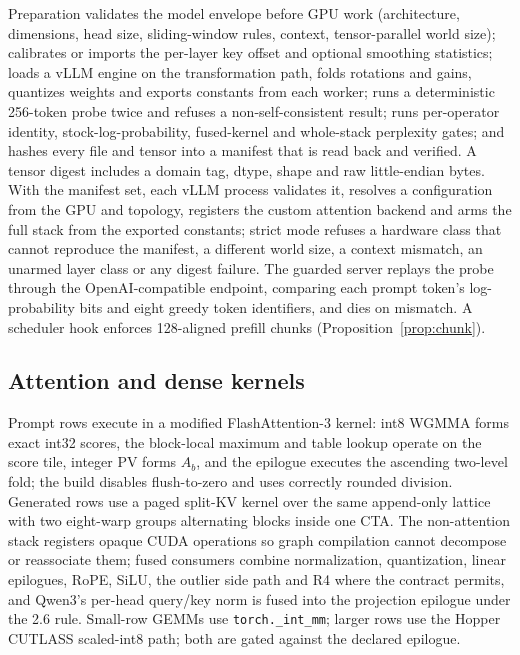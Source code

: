 \documentclass{article}
\begin{document}
Preparation validates the model envelope before GPU work (architecture, dimensions, head
size, sliding-window rules, context, tensor-parallel world size); calibrates or imports the
per-layer key offset and optional smoothing statistics; loads a vLLM engine on the
transformation path, folds rotations and gains, quantizes weights and exports constants from
each worker; runs a deterministic 256-token probe twice and refuses a non-self-consistent
result; runs per-operator identity, stock-log-probability, fused-kernel and whole-stack
perplexity gates; and hashes every file and tensor into a manifest that is read back and
verified.  A tensor digest includes a domain tag, dtype, shape and raw little-endian bytes.
With the manifest set, each vLLM process validates it, resolves a configuration from the GPU
and topology, registers the custom attention backend and arms the full stack from the
exported constants; strict mode refuses a hardware class that cannot reproduce the manifest,
a different world size, a context mismatch, an unarmed layer class or any digest failure.  The
guarded server replays the probe through the OpenAI-compatible endpoint, comparing each
prompt token's log-probability bits and eight greedy token identifiers, and dies on mismatch.
A scheduler hook enforces 128-aligned prefill chunks (Proposition~\ref{prop:chunk}).

\subsection{Attention and dense kernels}

Prompt rows execute in a modified FlashAttention-3 kernel: int8 WGMMA forms exact int32
scores, the block-local maximum and table lookup operate on the score tile, integer PV forms
$A_b$, and the epilogue executes the ascending two-level fold; the build disables
flush-to-zero and uses correctly rounded division.  Generated rows use a paged split-KV
kernel over the same append-only lattice with two eight-warp groups alternating blocks inside
one CTA.  The non-attention stack registers opaque CUDA operations so graph compilation
cannot decompose or reassociate them; fused consumers combine normalization, quantization,
linear epilogues, RoPE, SiLU, the outlier side path and R4 where the contract permits, and
Qwen3's per-head query/key norm is fused into the projection epilogue under the 2.6 rule.
Small-row GEMMs use \texttt{torch.\_int\_mm}; larger rows use the Hopper CUTLASS scaled-int8
path; both are gated against the declared epilogue.
\end{document}
